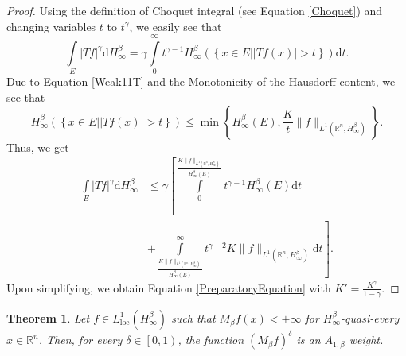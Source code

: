 \documentclass{amsart}
\newtheorem{theorem}{Theorem}
\numberwithin{theorem}{section}
\numberwithin{equation}{section}
\begin{document}
		\begin{proof}
			Using the definition of Choquet integral (see Equation \eqref{Choquet}) and changing variables $t$ to $t^{\gamma}$, we easily see that
			$$\int\limits_{E} \left| Tf \right|^{\gamma} \mathrm{d}H^{\beta}_{\infty} = \gamma \int\limits_{0}^{\infty} t^{\gamma - 1} H^{\beta}_{\infty} \left( \left\lbrace x \in E | \left| Tf \left( x \right) \right| > t \right\rbrace \right) \mathrm{d}t.$$
			Due to Equation \eqref{Weak11T} and the Monotonicity of the Hausdorff content, we see that
			$$H^{\beta}_{\infty} \left( \left\lbrace x \in E | \left| Tf \left( x \right) \right| > t \right\rbrace \right) \leq \min \left\lbrace H^{\beta}_{\infty} \left( E \right), \frac{K}{t} \| f \|_{L^1 \left( \mathbb{R}^n, H^{\beta}_{\infty} \right)} \right\rbrace.$$
			Thus, we get
			\begin{align*}
				\int\limits_{E} \left| Tf \right|^{\gamma} \mathrm{d}H^{\beta}_{\infty} &\leq \gamma \left[ \int\limits_{0}^{\frac{K \| f \|_{L^1 \left( \mathbb{R}^n, H^{\beta}_{\infty} \right)}}{H^{\beta}_{\infty} \left( E \right)}} t^{\gamma - 1} H^{\beta}_{\infty} \left( E \right) \mathrm{d}t \right. \\
				&\left. + \int\limits_{\frac{K \| f \|_{L^1 \left( \mathbb{R}^n, H^{\beta}_{\infty} \right)}}{H^{\beta}_{\infty} \left( E \right)}}^{\infty} t^{\gamma - 2} K \| f \|_{L^1 \left( \mathbb{R}^n, H^{\beta}_{\infty} \right)} \mathrm{d}t \right].
			\end{align*}
			Upon simplifying, we obtain Equation \eqref{PreparatoryEquation} with $K' = \frac{K^{\gamma}}{1 - \gamma}$.
		\end{proof}
		\begin{theorem}
			\label{ConstructionA1Weights}
			Let $f \in L^1_{\text{loc}} \left( H^{\beta}_{\infty} \right)$ such that $M_{\beta}f \left( x \right) < + \infty$ for $H^{\beta}_{\infty}$-quasi-every $x \in \mathbb{R}^n$. Then, for every $\delta \in \left[ 0, 1 \right)$, the function $\left( M_{\beta}f \right)^{\delta}$ is an $A_{1, \beta}$ weight.
		\end{theorem}
\end{document}
